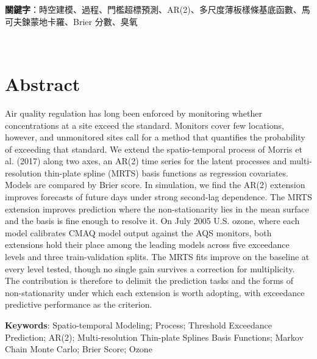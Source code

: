 \documentclass[12pt]{article}
\begin{document}
\vspace{2.0\baselineskip}

\noindent \textbf{關鍵字}：時空建模、\Skewt 過程、門檻超標預測、AR(2)、多尺度薄板樣條基底函數、馬可夫鍊蒙地卡羅、Brier 分數、臭氧

\newpage
\thispagestyle{empty}                   %
\WatermarkOff                           %
~ 

\newpage
\setcounter{page}{2}                    %
\WatermarkOn                            %
\section*{\centering Abstract}

Air quality regulation has long been enforced by monitoring whether
concentrations at a site exceed the standard. Monitors cover few locations,
however, and unmonitored sites call for a method that quantifies the
probability of exceeding that standard. We extend the spatio-temporal \skewt
process of Morris et al. (2017) along two axes, an AR(2) time series for
the latent processes and multi-resolution thin-plate spline (MRTS) basis
functions as regression covariates. Models are compared by Brier score. In
simulation, we find the AR(2) extension improves forecasts of future days under
strong second-lag dependence. The MRTS extension improves prediction where the
non-stationarity lies in the mean surface and the basis is fine enough to
resolve it. On July 2005 U.S. ozone, where each model calibrates
CMAQ model output against the AQS monitors, both extensions hold their place
among the leading models across five exceedance levels and three
train-validation splits. The MRTS fits improve on the baseline at every level
tested, though no single gain survives a correction for multiplicity. The
contribution is therefore to delimit the prediction tasks and the forms of
non-stationarity under which each extension is worth adopting, with exceedance
predictive performance as the criterion.

\vspace{2.0\baselineskip}

\noindent \textbf{Keywords}: Spatio-temporal Modeling; \Skewt Process; Threshold Exceedance Prediction; AR(2); Multi-resolution Thin-plate Splines Basis Functions; Markov Chain Monte Carlo; Brier Score; Ozone

\newpage
\thispagestyle{empty}                   %
\WatermarkOff                           %
~ 
\end{document}
